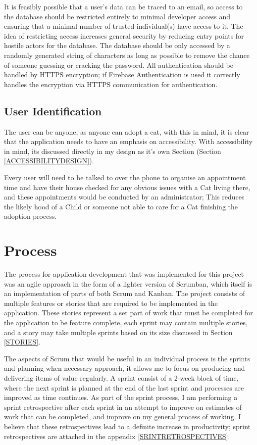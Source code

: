 It is feasibly possible that a user's data can be traced to an email, so access to the database should be restricted entirely to minimal developer access and ensuring that a minimal number of trusted individual(s) have access to it. The idea of restricting access increases general security by reducing entry points for hostile actors for the database. The database should be only accessed by a randomly generated string of characters as long as possible to remove the chance of someone guessing or cracking the password. All authentication should be handled by HTTPS encryption; if Firebase Authentication is used it correctly handles the encryption via HTTPS communication for authentication.

\subsection{User Identification}
The user can be anyone, as anyone can adopt a cat, with this in mind, it is clear that the application needs to have an emphasis on accessibility. With accessibility in mind, its discussed directly in my design as it's own Section (Section \ref{ACCESSIBILITYDESIGN}). 

Every user will need to be talked to over the phone to organise an appointment time and have their house checked for any obvious issues with a Cat living there, and these appointments would be conducted by an administrator; This reduces the likely hood of a Child or someone not able to care for a Cat finishing the adoption process.

\section{Process}

The process for application development that was implemented for this project was an agile approach in the form of a lighter version of Scrumban, which itself is an implementation of parts of both Scrum and Kanban. The project consists of multiple features or stories that are required to be implemented in the application. These stories represent a set part of work that must be completed for the application to be feature complete, each sprint may contain multiple stories, and a story may take multiple sprints based on its size discussed in Section \ref{STORIES}.

The aspects of Scrum that would be useful in an individual process is the sprints and planning when necessary approach, it allows me to focus on producing and delivering items of value regularly. A sprint consist of a 2-week block of time, where the next sprint is planned at the end of the last sprint and processes are improved as time continues. As part of the sprint process, I am performing a sprint retrospective after each sprint in an attempt to improve on estimates of work that can be completed, and improve on my general process of working. I believe that these retrospectives lead to a definite increase in productivity; sprint retrospectives are attached in the appendix \ref{SRINTRETROSPECTIVES}.

